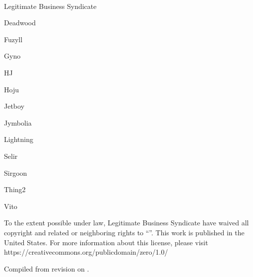 \thispagestyle{plain}
\begin{center}
  \centering
      {
        \LARGE \thetitle
      }
      \\[2em]
      {
          \Large Legitimate Business Syndicate
      }
      \\[1em]

      \begin{itemize*}[label=]
      \item Deadwood
      \item Fuzyll
      \item Gyno
      \item HJ
      \item Hoju
      \item Jetboy
      \item Jymbolia
      \item Lightning
      \item Selir
      \item Sirgoon
      \item Thing2
      \item Vito
      \end{itemize*}
\end{center}

To the extent possible under law, Legitimate Business Syndicate have waived all
copyright and related or neighboring rights to ``\thetitle''. This work is
published in the United States. For more information about this license, please
visit https://creativecommons.org/publicdomain/zero/1.0/

Compiled from revision
\texttt{} on .

\newpage
